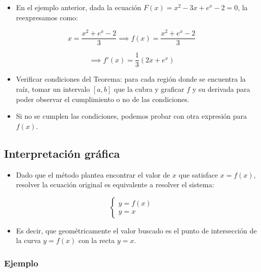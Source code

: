\documentclass[openany]{book}
\providecommand{\tightlist}{%
  \setlength{\itemsep}{0pt}\setlength{\parskip}{0pt}}
\begin{document}
\begin{itemize}
\tightlist
\item
  En el ejemplo anterior, dada la ecuación \(F(x) = x^2-3x+e^x-2=0\), la reexpresamos como:
\end{itemize}

\[x = \frac{x^2+e^x-2}{3} \implies f(x)= \frac{x^2+e^x-2}{3}\]

\[\implies f'(x) = \frac{1}{3}(2x+e^x)\]

\begin{itemize}
\tightlist
\item
  Verificar condiciones del Teorema: para cada región donde se encuentra la raíz, tomar un intervalo \([a, b]\) que la cubra y graficar \(f\) y su derivada para poder observar el cumplimiento o no de las condiciones.
\item
  Si no se cumplen las condiciones, podemos probar con otra expresión para \(f(x)\).
\end{itemize}

\hypertarget{interpretaciuxf3n-gruxe1fica}{%
\subsection{Interpretación gráfica}\label{interpretaciuxf3n-gruxe1fica}}

\begin{itemize}
\tightlist
\item
  Dado que el método plantea encontrar el valor de \(x\) que satisface \(x = f(x)\), resolver la ecuación original es equivalente a resolver el sistema:
\end{itemize}

\begin{equation}
  \begin{cases}
    y = f(x) \\
    y = x
  \end{cases}
\end{equation}

\begin{itemize}
\tightlist
\item
  Es decir, que geométricamente el valor buscado es el punto de intersección de la curva \(y=f(x)\) con la recta \(y=x\).
\end{itemize}

\hypertarget{ejemplo-5}{%
\subsubsection*{Ejemplo}\label{ejemplo-5}}
\end{document}
